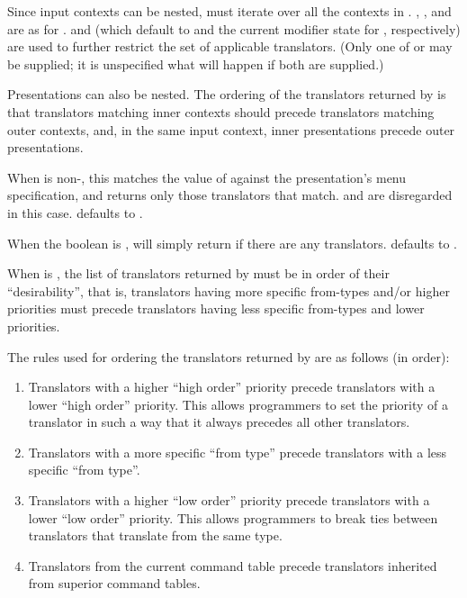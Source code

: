 Since input contexts can be nested,  must
iterate over all the contexts in .  , ,
and  are as for .   and
 (which default to  and the current modifier state
for , respectively) are used to further restrict the set of
applicable translators.  (Only one of  or  may be
supplied; it is unspecified what will happen if both are supplied.)

Presentations can also be nested.  The ordering of the translators returned by
 is that translators matching inner contexts
should precede translators matching outer contexts, and, in the same input
context, inner presentations precede outer presentations.

When  is non-, this matches the value of 
against the presentation's menu specification, and returns only those
translators that match.   and  are disregarded in
this case.   defaults to .

When the boolean  is , 
will simply return  if there are any translators.  
defaults to .

When  is , the list of translators returned by
 must be in order of their ``desirability'',
that is, translators having more specific from-types and/or higher priorities
must precede translators having less specific from-types and lower priorities.

The rules used for ordering the translators returned by
 are as follows (in order):

\begin{enumerate}
\item Translators with a higher ``high order'' priority precede translators with
a lower ``high order'' priority.  This allows programmers to set the priority of
a translator in such a way that it always precedes all other translators.

\item Translators with a more specific ``from type'' precede translators with a
less specific ``from type''.

\item Translators with a higher ``low order'' priority precede translators with
a lower ``low order'' priority.  This allows programmers to break ties between
translators that translate from the same type.

\item Translators from the current command table precede translators inherited
from superior command tables.
\end{enumerate}

